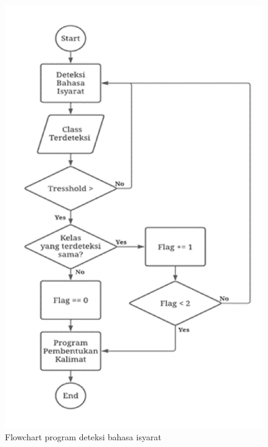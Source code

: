 \begin{figure}[H]
  \centering

  \includegraphics[scale=0.54]{gambar/bab3-flowchart-deteksi.png}

  \caption{Flowchart program deteksi bahasa isyarat}
  \label{fig:flowchartdeteksi}
\end{figure}
